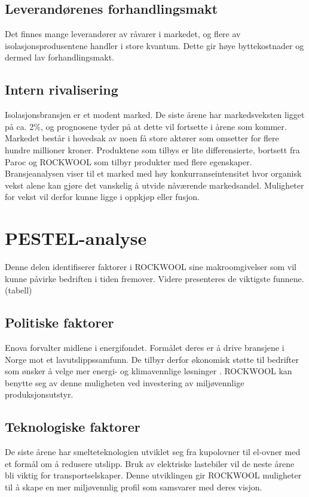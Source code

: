 \subsection{Leverandørenes forhandlingsmakt}
Det finnes mange leverandører av råvarer i markedet, og flere av isolasjonsprodusentene handler i store kvantum. Dette gir høye byttekostnader og dermed lav forhandlingsmakt.

\subsection{Intern rivalisering}
Isolasjonsbransjen er et modent marked. De siste årene har markedsveksten ligget på ca. 2\%, og prognosene tyder på at dette vil fortsette i årene som kommer. Markedet består i hovedsak av noen få store aktører som omsetter for flere hundre millioner kroner. Produktene som tilbys er lite differensierte, bortsett fra Paroc og ROCKWOOL som tilbyr produkter med flere egenskaper. Bransjeanalysen viser til et marked med høy konkurranseintensitet hvor organisk vekst alene kan gjøre det vanskelig å utvide nåværende markedsandel. Muligheter for vekst vil derfor kunne ligge i oppkjøp eller fusjon.

\section{PESTEL-analyse}
Denne delen identifiserer faktorer i ROCKWOOL sine makroomgivelser som vil kunne påvirke bedriften i tiden fremover. Videre presenteres de viktigste funnene.
(tabell)

\subsection{Politiske faktorer}
Enova forvalter midlene i energifondet. Formålet deres er å drive bransjene i Norge mot et lavutslippssamfunn. De tilbyr derfor økonomisk støtte til bedrifter som ønsker å velge mer energi- og klimavennlige løsninger \cite{Enova}. ROCKWOOL kan benytte seg av denne muligheten ved investering av miljøvennlige produksjonsutstyr.

\subsection{Teknologiske faktorer}
De siste årene har smelteteknologien utviklet seg fra kupolovner til el-ovner med et formål om å redusere utslipp. Bruk av elektriske lastebiler vil de neste årene bli viktig for transportselskaper. Denne utviklingen gir ROCKWOOL muligheter til å skape en mer miljøvennlig profil som samsvarer med deres visjon.


